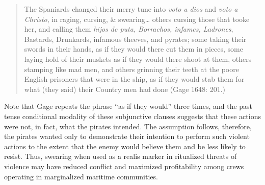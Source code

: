 \documentclass[12pt]{article}
\newenvironment{styleStandard}{\renewcommand\baselinestretch{1.0}\setlength\leftskip{0cm}\setlength\rightskip{0cm plus 1fil}\setlength\parindent{0cm}\setlength\parfillskip{0pt plus 1fil}\setlength\parskip{0in plus 1pt}\writerlistparindent\writerlistleftskip\leavevmode\normalfont\normalsize\writerlistlabel\ignorespaces}{\unskip\vspace{0in plus 1pt}\par}
\newcommand\writerlistleftskip{}
\newcommand\writerlistparindent{}
\newcommand\writerlistlabel{}
\begin{document}
\begin{quotation}
The Spaniards changed their merry tune into \textit{voto a dios} and \textit{voto a Christo}, in raging, cursing, \& swearing… others cursing those that tooke her, and calling them \textit{hijos de puta, Borrachos, infames, Ladrones}, Bastards, Drunkards, infamous theeves, and pyrates; some taking their swords in their hands, as if they would there cut them in pieces, some laying hold of their muskets as if they would there shoot at them, others stamping like mad men, and others grinning their teeth at the poore English prisoners that were in the ship, as if they would stab them for what (they said) their Country men had done (Gage 1648: 201.)

\end{quotation}
\begin{styleStandard}
Note that Gage repeats the phrase “as if they would” three times, and the past tense conditional modality of these subjunctive clauses suggests that these actions were not, in fact, what the pirates intended. The assumption follows, therefore, the pirates wanted only to demonstrate their intention to perform such violent actions to the extent that the enemy would believe them and be less likely to resist. Thus, swearing when used as a realis marker in ritualized threats of violence may have reduced conflict and maximized profitability among crews operating in marginalized maritime communities. 
\end{styleStandard}
\end{document}

